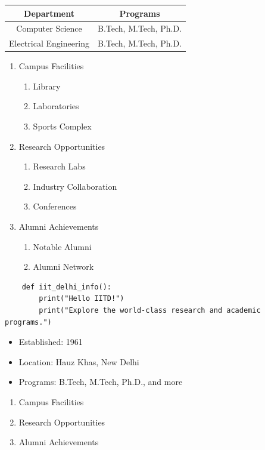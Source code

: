 \documentclass{article}
\begin{document}
\begin{tabular}{|c|c|}
\hline
Department & Programs \\
\hline
Computer Science & B.Tech, M.Tech, Ph.D. \\
Electrical Engineering & B.Tech, M.Tech, Ph.D. \\
\hline
\end{tabular}


\begin{enumerate}
    \item Campus Facilities
    \begin{enumerate}
        \item Library
        \item Laboratories
        \item Sports Complex
    \end{enumerate}
    \item Research Opportunities
    \begin{enumerate}
        \item Research Labs
        \item Industry Collaboration
        \item Conferences
    \end{enumerate}
    \item Alumni Achievements
    \begin{enumerate}
        \item Notable Alumni
        \item Alumni Network
    \end{enumerate}
\end{enumerate}



\begin{verbatim}
    def iit_delhi_info():
        print("Hello IITD!")
        print("Explore the world-class research and academic programs.")
\end{verbatim}


\begin{itemize}
    \item Established: 1961
    \item Location: Hauz Khas, New Delhi
    \item Programs: B.Tech, M.Tech, Ph.D., and more
\end{itemize}

\begin{enumerate}
    \item Campus Facilities
    \item Research Opportunities
    \item Alumni Achievements
\end{enumerate}
\end{document}
